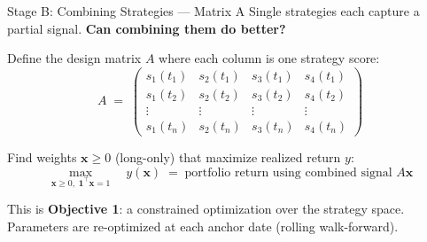 \documentclass[aspectratio=169]{beamer}
\begin{document}
\begin{frame}{Stage B: Combining Strategies — Matrix A}
  Single strategies each capture a partial signal.
  \textbf{Can combining them do better?}

  \vspace{0.6em}
  Define the design matrix \(A\) where each column is one strategy score:
  \[
    A \;=\;
    \begin{pmatrix}
      s_1(t_1) & s_2(t_1) & s_3(t_1) & s_4(t_1) \\
      s_1(t_2) & s_2(t_2) & s_3(t_2) & s_4(t_2) \\
      \vdots   & \vdots   & \vdots   & \vdots   \\
      s_1(t_n) & s_2(t_n) & s_3(t_n) & s_4(t_n)
    \end{pmatrix}
  \]

  \vspace{0.4em}
  Find weights \(\mathbf{x} \geq 0\) (long-only) that maximize realized return \(y\):
  \[
    \max_{\mathbf{x} \geq 0,\; \mathbf{1}^\top \mathbf{x} = 1}
    \quad y(\mathbf{x}) \;=\; \text{portfolio return using combined signal } A\mathbf{x}
  \]

  \vspace{0.4em}
  This is \textbf{Objective 1}: a constrained optimization over the strategy space.\\
  Parameters are re-optimized at each anchor date (rolling walk-forward).
\end{frame}
\end{document}
